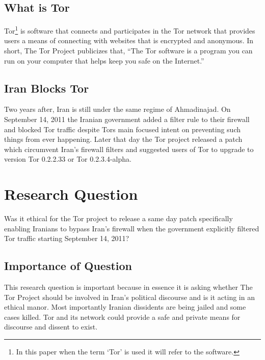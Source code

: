 \documentclass[11pt]{article}
\begin{document}
\begin{multicols}{2}
\subsection{What is Tor}

Tor\footnote{In this paper when the term `Tor' is used it will refer to the
software.} is software that connects and participates in the Tor network that
provides users a means of connecting with websites that is encrypted and
anonymous. In short, The Tor Project publicizes that, ``The Tor software is a
program you can run on your computer that helps keep you safe on the
Internet.''\cite{Tor:FAQ} 

\subsection{Iran Blocks Tor}

Two years after, Iran is still under the same regime of Ahmadinajad.  On
September 14, 2011 the Iranian government added a filter rule to their firewall
and blocked Tor traffic despite Tors main focused intent on preventing such
things from ever happening. \cite{IranBlocksTorSameDayFix}  Later that day the
Tor project released a patch which circumvent Iran's firewall filters and
suggested users of Tor to upgrade to version Tor 0.2.2.33 or Tor
0.2.3.4-alpha.\cite{IranBlocksTorSameDayFix}

\section{Research Question} 
Was it ethical for the Tor project to release a same day patch specifically
enabling Iranians to bypass Iran's firewall when the government explicitly
filtered Tor traffic starting September 14, 2011?

\subsection{Importance of Question}

This research question is important because in essence it is asking whether The
Tor Project should be involved in Iran's political discourse and is it acting in
an ethical manor. Most importantly Iranian dissidents are being jailed and some
cases killed.\cite{IranBloggersDeath} Tor and its network could provide a safe
and private means for discourse and dissent to exist.



\end{multicols}
\end{document}
